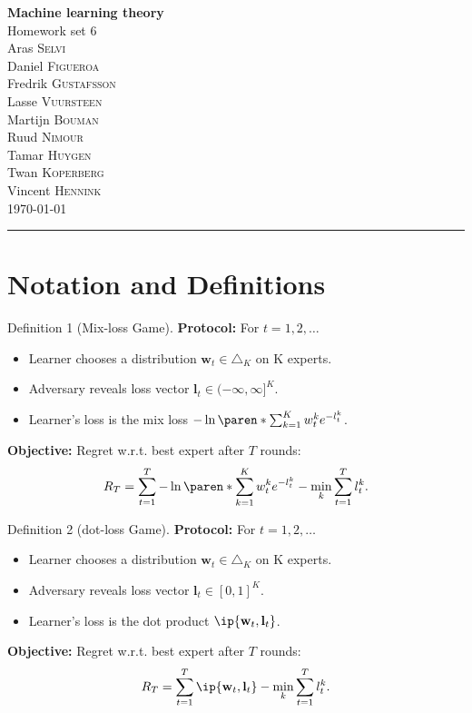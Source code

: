 \documentclass[10pt, a4paper, twoside]{amsart}
\theoremstyle{plain}
\DeclarePairedDelimiter\paren()
\DeclarePairedDelimiter{\ip}\langle\rangle
\begin{document}
\begin{center}
    {\huge\bf Machine learning theory}\\
    {\large\sc Homework set 6 }\\ \vspace{1em}
    {Aras} \textsc{ {Selvi}} \\
    {Daniel} \textsc{ {Figueroa}}\\
    {Fredrik} \textsc{ {Gustafsson}}\\
    {Lasse} \textsc{ {Vuursteen}}\\
    {Martijn} \textsc{ {Bouman}}\\
    {Ruud} \textsc{ {Nimour}}\\
    {Tamar} \textsc{ {Huygen}}\\
    {Twan} \textsc{ {Koperberg}}\\
    {Vincent} \textsc{ {Hennink}}\\ 
    \bigskip
    \today \bigskip
    \hrule
    \bigskip
\end{center}

\section{Notation and Definitions}
\begin{definitionbox}{Definition 1 (Mix-loss Game).}
\textbf{Protocol:} For $t = 1,2, \ldots$
\begin{itemize}
    \item Learner chooses a distribution $\mathbf{w}_t \in \triangle_K$ on K experts.
    \item Adversary reveals loss vector $\mathbf{l}_t \in (-\infty , \infty]^K$.
    \item Learner's loss is the mix loss $-\ln \paren*{\sum_{k=1}^K w_t^k e^{-l_t^k}}$.
\end{itemize}
\textbf{Objective:} Regret w.r.t. best expert after $T$ rounds:
\begin{equation*}
    R_T = \sum^T_{t=1} - \ln \paren*{\sum_{k=1}^K w_t^k e^{-l_t^k}} - \min_k \sum_{t=1}^T l_t^k .
\end{equation*}
\end{definitionbox}
\begin{definitionbox}{Definition 2 (dot-loss Game).}
\textbf{Protocol:} For $t = 1,2, \ldots$
\begin{itemize}
    \item Learner chooses a distribution $\mathbf{w}_t \in \triangle_K$ on K experts.
    \item Adversary reveals loss vector $\mathbf{l}_t \in [0,1]^K$.
    \item Learner's loss is the dot product $\ip{\mathbf{w}_t , \mathbf{l}_t}$.
\end{itemize}
\textbf{Objective:} Regret w.r.t. best expert after $T$ rounds:
\begin{equation*}
    R_T = \sum^T_{t=1} \ip{\mathbf{w}_t , \mathbf{l}_t} - \min_k \sum_{t=1}^T l_t^k .
\end{equation*}
\end{definitionbox}
\end{document}
